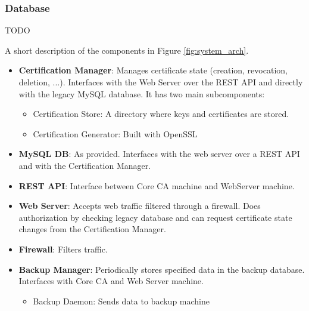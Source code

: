 \documentclass[english]{article}
\begin{document}
\subsubsection{Database}
TODO

A short description of the components in Figure \ref{fig:system_arch}.

\begin{itemize}
    \item \textbf{Certification Manager}: Manages certificate state (creation, revocation, deletion, ...). Interfaces with the Web Server over the REST API and directly with the legacy MySQL database. It has two main subcomponents:
    \begin{itemize}
        \item Certification Store: A directory where keys and certificates are stored.
        \item Certification Generator: Built with OpenSSL
    \end{itemize}
    \item \textbf{MySQL DB}: As provided. Interfaces with the web server over a REST API and with the Certification Manager.
    \item \textbf{REST API}: Interface between Core CA machine and WebServer machine.
    \item \textbf{Web Server}: Accepts web traffic filtered through a firewall. Does authorization by checking legacy database and can request certificate state changes from the Certification Manager.
    \item \textbf{Firewall}: Filters traffic.
    \item \textbf{Backup Manager}: Periodically stores specified data in the backup database. Interfaces with Core CA and Web Server machine.
    \begin{itemize}
        \item Backup Daemon: Sends data to backup machine
    \end{itemize}
\end{itemize}
\end{document}

